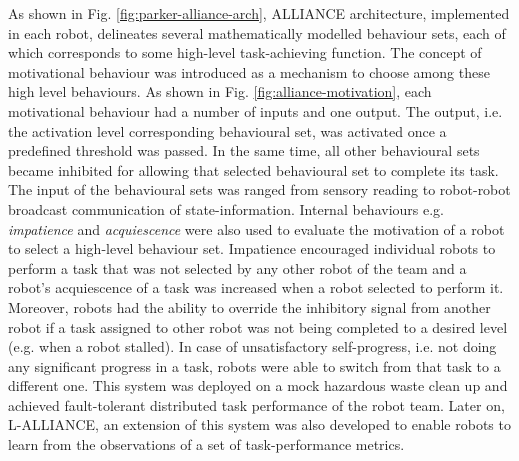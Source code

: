 As shown in Fig. \ref{fig:parker-alliance-arch}, ALLIANCE architecture, implemented in each robot, delineates several mathematically modelled behaviour sets, each of which corresponds to some high-level task-achieving function. The concept of motivational behaviour was introduced  as a mechanism to choose among these high level behaviours. As shown in Fig. \ref{fig:alliance-motivation}, each motivational behaviour had a number of inputs and one output. The output, i.e. the activation level corresponding behavioural set, was activated once a predefined threshold was passed. In the same time, all other behavioural sets became inhibited for allowing that selected behavioural set to complete its task. The input of the behavioural sets was ranged from sensory reading to robot-robot broadcast communication of state-information. Internal behaviours e.g. {\em impatience}  and {\em acquiescence} were also used to evaluate the motivation of a robot to select a high-level behaviour set.  Impatience encouraged individual robots to perform a task that was not selected by any other robot of the team and a robot's acquiescence of a task was increased when a robot selected to perform it.  Moreover, robots had the ability to override the inhibitory signal from another robot if a task assigned to other robot was not being completed to a desired level (e.g. when a robot stalled). In case of unsatisfactory self-progress, i.e. not doing any significant progress in a task, robots were able to switch from that task to a different one. This system was deployed on a mock hazardous waste clean up and achieved fault-tolerant distributed task performance of the robot team. Later on, L-ALLIANCE, an extension of this system was also developed to enable robots  to learn from the observations of a set of task-performance metrics. \\

